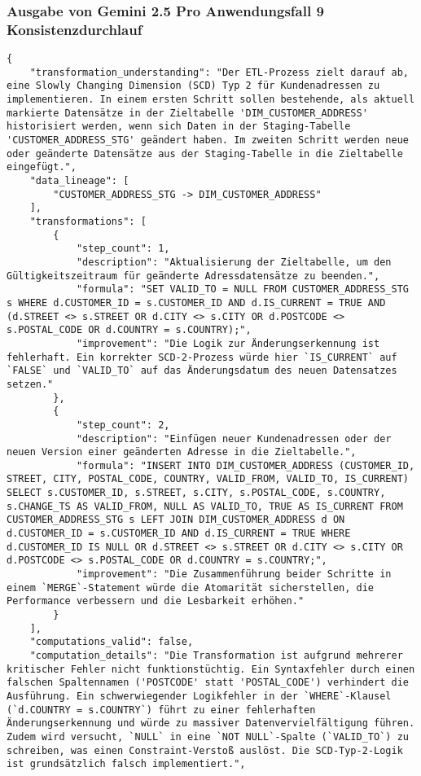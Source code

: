 \subsubsection{Ausgabe von Gemini 2.5 Pro Anwendungsfall 9 Konsistenzdurchlauf}\label{anhang:subsubsec:gemini_case9_prompt2}
\begin{lstlisting}[caption={Ausgabe: Gemini 2.5 Pro Anwendungsfall 9 Konsistenzdurchlauf},label={gemini_case9_prompt2}]
{
    "transformation_understanding": "Der ETL-Prozess zielt darauf ab, eine Slowly Changing Dimension (SCD) Typ 2 für Kundenadressen zu implementieren. In einem ersten Schritt sollen bestehende, als aktuell markierte Datensätze in der Zieltabelle 'DIM_CUSTOMER_ADDRESS' historisiert werden, wenn sich Daten in der Staging-Tabelle 'CUSTOMER_ADDRESS_STG' geändert haben. Im zweiten Schritt werden neue oder geänderte Datensätze aus der Staging-Tabelle in die Zieltabelle eingefügt.",
    "data_lineage": [
        "CUSTOMER_ADDRESS_STG -> DIM_CUSTOMER_ADDRESS"
    ],
    "transformations": [
        {
            "step_count": 1,
            "description": "Aktualisierung der Zieltabelle, um den Gültigkeitszeitraum für geänderte Adressdatensätze zu beenden.",
            "formula": "SET VALID_TO = NULL FROM CUSTOMER_ADDRESS_STG s WHERE d.CUSTOMER_ID = s.CUSTOMER_ID AND d.IS_CURRENT = TRUE AND (d.STREET <> s.STREET OR d.CITY <> s.CITY OR d.POSTCODE <> s.POSTAL_CODE OR d.COUNTRY = s.COUNTRY);",
            "improvement": "Die Logik zur Änderungserkennung ist fehlerhaft. Ein korrekter SCD-2-Prozess würde hier `IS_CURRENT` auf `FALSE` und `VALID_TO` auf das Änderungsdatum des neuen Datensatzes setzen."
        },
        {
            "step_count": 2,
            "description": "Einfügen neuer Kundenadressen oder der neuen Version einer geänderten Adresse in die Zieltabelle.",
            "formula": "INSERT INTO DIM_CUSTOMER_ADDRESS (CUSTOMER_ID, STREET, CITY, POSTAL_CODE, COUNTRY, VALID_FROM, VALID_TO, IS_CURRENT) SELECT s.CUSTOMER_ID, s.STREET, s.CITY, s.POSTAL_CODE, s.COUNTRY, s.CHANGE_TS AS VALID_FROM, NULL AS VALID_TO, TRUE AS IS_CURRENT FROM CUSTOMER_ADDRESS_STG s LEFT JOIN DIM_CUSTOMER_ADDRESS d ON d.CUSTOMER_ID = s.CUSTOMER_ID AND d.IS_CURRENT = TRUE WHERE d.CUSTOMER_ID IS NULL OR d.STREET <> s.STREET OR d.CITY <> s.CITY OR d.POSTCODE <> s.POSTAL_CODE OR d.COUNTRY = s.COUNTRY;",
            "improvement": "Die Zusammenführung beider Schritte in einem `MERGE`-Statement würde die Atomarität sicherstellen, die Performance verbessern und die Lesbarkeit erhöhen."
        }
    ],
    "computations_valid": false,
    "computation_details": "Die Transformation ist aufgrund mehrerer kritischer Fehler nicht funktionstüchtig. Ein Syntaxfehler durch einen falschen Spaltennamen ('POSTCODE' statt 'POSTAL_CODE') verhindert die Ausführung. Ein schwerwiegender Logikfehler in der `WHERE`-Klausel (`d.COUNTRY = s.COUNTRY`) führt zu einer fehlerhaften Änderungserkennung und würde zu massiver Datenvervielfältigung führen. Zudem wird versucht, `NULL` in eine `NOT NULL`-Spalte (`VALID_TO`) zu schreiben, was einen Constraint-Verstoß auslöst. Die SCD-Typ-2-Logik ist grundsätzlich falsch implementiert.",

\end{lstlisting}
